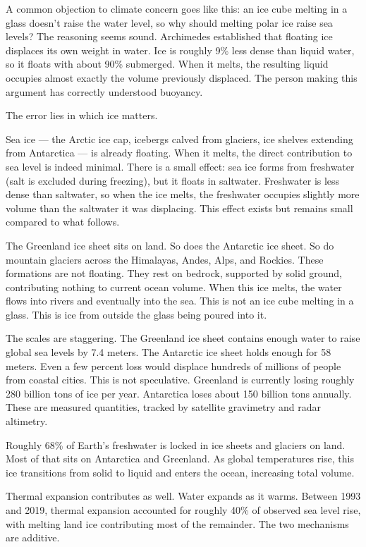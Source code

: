 \begin{commentary}
A common objection to climate concern goes like this: an ice cube melting in a glass doesn't raise the water level, so why should melting polar ice raise sea levels? The reasoning seems sound. Archimedes established that floating ice displaces its own weight in water. Ice is roughly 9\% less dense than liquid water, so it floats with about 90\% submerged. When it melts, the resulting liquid occupies almost exactly the volume previously displaced. The person making this argument has correctly understood buoyancy.

The error lies in which ice matters.

Sea ice — the Arctic ice cap, icebergs calved from glaciers, ice shelves extending from Antarctica — is already floating. When it melts, the direct contribution to sea level is indeed minimal. There is a small effect: sea ice forms from freshwater (salt is excluded during freezing), but it floats in saltwater. Freshwater is less dense than saltwater, so when the ice melts, the freshwater occupies slightly more volume than the saltwater it was displacing. This effect exists but remains small compared to what follows.

The Greenland ice sheet sits on land. So does the Antarctic ice sheet. So do mountain glaciers across the Himalayas, Andes, Alps, and Rockies. These formations are not floating. They rest on bedrock, supported by solid ground, contributing nothing to current ocean volume. When this ice melts, the water flows into rivers and eventually into the sea. This is not an ice cube melting in a glass. This is ice from outside the glass being poured into it.

The scales are staggering. The Greenland ice sheet contains enough water to raise global sea levels by 7.4 meters. The Antarctic ice sheet holds enough for 58 meters. Even a few percent loss would displace hundreds of millions of people from coastal cities. This is not speculative. Greenland is currently losing roughly 280 billion tons of ice per year. Antarctica loses about 150 billion tons annually. These are measured quantities, tracked by satellite gravimetry and radar altimetry.

Roughly 68\% of Earth's freshwater is locked in ice sheets and glaciers on land. Most of that sits on Antarctica and Greenland. As global temperatures rise, this ice transitions from solid to liquid and enters the ocean, increasing total volume.

Thermal expansion contributes as well. Water expands as it warms. Between 1993 and 2019, thermal expansion accounted for roughly 40\% of observed sea level rise, with melting land ice contributing most of the remainder. The two mechanisms are additive.
\end{commentary}

